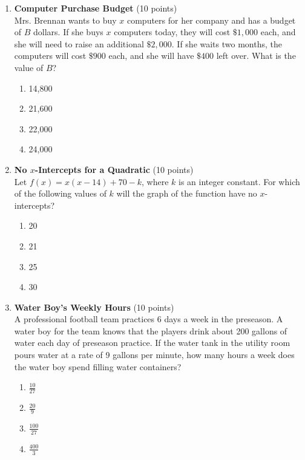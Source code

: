 \begin{enumerate}
  \item \textbf{Computer Purchase Budget} (10 points)\\
  Mrs. Brennan wants to buy $x$ computers for her company and has a budget of $B$ dollars. If she buys $x$ computers today, they will cost $\$1,000$ each, and she will need to raise an additional $\$2,000$. If she waits two months, the computers will cost $\$900$ each, and she will have $\$400$ left over. What is the value of $B$?
  \begin{enumerate}[label=(\Alph*)]
    \item 14,800
    \item 21,600
    \item 22,000
    \item 24,000
  \end{enumerate}
  \begin{subanswer}
  \end{subanswer}



  \item \textbf{No $x$-Intercepts for a Quadratic} (10 points)\\
  Let $f(x) = x(x-14) + 70 - k$, where $k$ is an integer constant. For which of the following values of $k$ will the graph of the function have no $x$-intercepts?
  \begin{enumerate}[label=(\Alph*)]
    \item 20
    \item 21
    \item 25
    \item 30
  \end{enumerate}
  \begin{subanswer}
  \end{subanswer}



  \item \textbf{Water Boy's Weekly Hours} (10 points)\\
  A professional football team practices 6 days a week in the preseason. A water boy for the team knows that the players drink about 200 gallons of water each day of preseason practice. If the water tank in the utility room pours water at a rate of 9 gallons per minute, how many hours a week does the water boy spend filling water containers?
  \begin{enumerate}[label=(\Alph*)]
    \item $\frac{10}{27}$
    \item $\frac{20}{9}$
    \item $\frac{100}{27}$
    \item $\frac{400}{3}$
  \end{enumerate}
  \begin{subanswer}
  \end{subanswer}




\end{enumerate}
